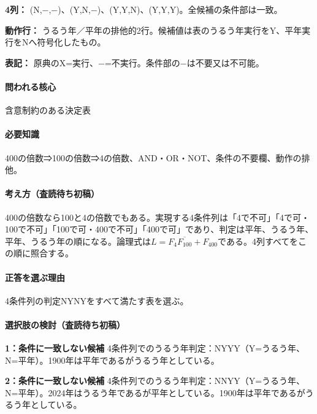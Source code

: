 \noindent\textbf{4列：} (N,−,−)、(Y,N,−)、(Y,Y,N)、(Y,Y,Y)。全候補の条件部は一致。\par

\noindent\textbf{動作行：} うるう年／平年の排他的2行。候補値は表のうるう年実行をY、平年実行をNへ符号化したもの。\par

\noindent\textbf{表記：} 原典のX=実行、−=不実行。条件部の−は不要又は不可能。\par

\paragraph{問われる核心} 含意制約のある決定表

\paragraph{必要知識} 400の倍数⇒100の倍数⇒4の倍数、AND・OR・NOT、条件の不要欄、動作の排他。

\paragraph{考え方（査読待ち初稿）} 400の倍数なら100と4の倍数でもある。実現する4条件列は「4で不可」「4で可・100で不可」「100で可・400で不可」「400で可」であり、判定は平年、うるう年、平年、うるう年の順になる。論理式は\(L=F_4\overline{F_{100}}+F_{400}\)である。4列すべてをこの順に照合する。

\paragraph{正答を選ぶ理由} 4条件列の判定NYNYをすべて満たす表を選ぶ。

\paragraph{選択肢の検討（査読待ち初稿）}\mbox{}\par

\noindent\textbf{1：条件に一致しない候補} 4条件列でのうるう年判定：NYYY（Y=うるう年、N=平年）。1900年は平年であるがうるう年としている。\par

\noindent\textbf{2：条件に一致しない候補} 4条件列でのうるう年判定：NNYY（Y=うるう年、N=平年）。2024年はうるう年であるが平年としている。1900年は平年であるがうるう年としている。\par


